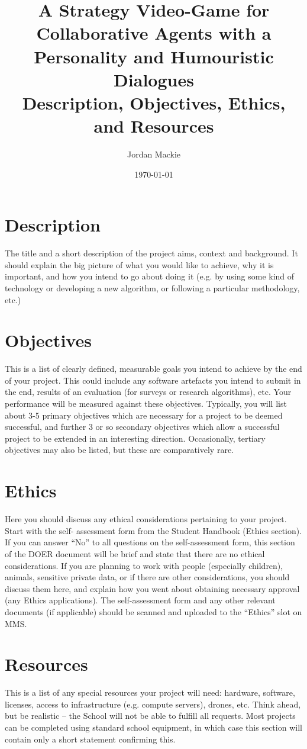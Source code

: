\documentclass[12pt]{extarticle}
\title{%
  A Strategy Video-Game for Collaborative Agents with a Personality and Humouristic Dialogues \\
  \large Description, Objectives, Ethics, and Resources \\}
\author{Jordan Mackie}
\date{\today}
\begin{document}
\maketitle



\section{Description}

The title and a short description of the project aims,
context and background. It should explain the big
picture of what you would like to achieve, why it is
important, and how you intend to go about doing it (e.g.
by using some kind of technology or developing a new
algorithm, or following a particular methodology, etc.)

\section{Objectives}

This is a list of clearly defined, measurable goals you
intend to achieve by the end of your project. This could
include any software artefacts you intend to submit in
the end, results of an evaluation (for surveys or research
algorithms), etc. Your performance will be measured
against these objectives.
Typically, you will list about 3-5 primary objectives
which are necessary for a project to be deemed
successful, and further 3 or so secondary objectives
which allow a successful project to be extended in an
interesting direction. Occasionally, tertiary objectives
may also be listed, but these are comparatively rare.

\section{Ethics}

Here you should discuss any ethical considerations
pertaining to your project. Start with the self-
assessment form from the Student Handbook (Ethics
section). If you can answer “No” to all questions on the
self-assessment form, this section of the DOER
document will be brief and state that there are no ethical
considerations.
If you are planning to work with people (especially
children), animals, sensitive private data, or if there are
other considerations, you should discuss them here, and
explain how you went about obtaining necessary
approval (any Ethics applications).
The self-assessment form and any other relevant
documents (if applicable) should be scanned and
uploaded to the “Ethics” slot on MMS.

\section{Resources}

This is a list of any special resources your project will
need: hardware, software, licenses, access to
infrastructure (e.g. compute servers), drones, etc. Think
ahead, but be realistic -- the School will not be able to
fulfill all requests.
Most projects can be completed using standard school
equipment, in which case this section will contain only a
short statement confirming this.
\end{document}
